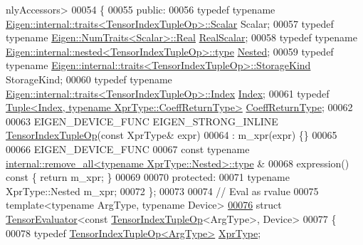 \begin{DoxyCode}
      nlyAccessors>
00054 \{
00055   \textcolor{keyword}{public}:
00056   \textcolor{keyword}{typedef} \textcolor{keyword}{typename} \hyperlink{struct_eigen_1_1internal_1_1traits}{Eigen::internal::traits<TensorIndexTupleOp>::Scalar}
       Scalar;
00057   \textcolor{keyword}{typedef} \textcolor{keyword}{typename} \hyperlink{group___sparse_core___module}{Eigen::NumTraits<Scalar>::Real} 
      \hyperlink{group___sparse_core___module}{RealScalar};
00058   \textcolor{keyword}{typedef} \textcolor{keyword}{typename} \hyperlink{class_eigen_1_1internal_1_1_tensor_lazy_evaluator_writable}{Eigen::internal::nested<TensorIndexTupleOp>::type}
       \hyperlink{class_eigen_1_1internal_1_1_tensor_lazy_evaluator_writable}{Nested};
00059   \textcolor{keyword}{typedef} \textcolor{keyword}{typename} \hyperlink{struct_eigen_1_1internal_1_1traits}{Eigen::internal::traits<TensorIndexTupleOp>::StorageKind}
       StorageKind;
00060   \textcolor{keyword}{typedef} \textcolor{keyword}{typename} \hyperlink{struct_eigen_1_1internal_1_1traits}{Eigen::internal::traits<TensorIndexTupleOp>::Index}
       \hyperlink{namespace_eigen_a62e77e0933482dafde8fe197d9a2cfde}{Index};
00061   \textcolor{keyword}{typedef} \hyperlink{struct_eigen_1_1_tuple}{Tuple<Index, typename XprType::CoeffReturnType>} 
      \hyperlink{struct_eigen_1_1_tuple}{CoeffReturnType};
00062 
00063   EIGEN\_DEVICE\_FUNC EIGEN\_STRONG\_INLINE \hyperlink{class_eigen_1_1_tensor_index_tuple_op}{TensorIndexTupleOp}(\textcolor{keyword}{const} XprType& expr)
00064       : m\_xpr(expr) \{\}
00065 
00066   EIGEN\_DEVICE\_FUNC
00067   \textcolor{keyword}{const} \textcolor{keyword}{typename} \hyperlink{group___sparse_core___module}{internal::remove\_all<typename XprType::Nested>::type}
      &
00068   expression()\textcolor{keyword}{ const }\{ \textcolor{keywordflow}{return} m\_xpr; \}
00069 
00070   \textcolor{keyword}{protected}:
00071     \textcolor{keyword}{typename} XprType::Nested m\_xpr;
00072 \};
00073 
00074 \textcolor{comment}{// Eval as rvalue}
00075 \textcolor{keyword}{template}<\textcolor{keyword}{typename} ArgType, \textcolor{keyword}{typename} Device>
\hyperlink{struct_eigen_1_1_tensor_evaluator_3_01const_01_tensor_index_tuple_op_3_01_arg_type_01_4_00_01_device_01_4}{00076} \textcolor{keyword}{struct }\hyperlink{struct_eigen_1_1_tensor_evaluator}{TensorEvaluator}<const \hyperlink{class_eigen_1_1_tensor_index_tuple_op}{TensorIndexTupleOp}<ArgType>, Device>
00077 \{
00078   \textcolor{keyword}{typedef} \hyperlink{class_eigen_1_1_tensor_index_tuple_op}{TensorIndexTupleOp<ArgType>} \hyperlink{class_eigen_1_1_tensor_index_tuple_op}{XprType};

\end{DoxyCode}
